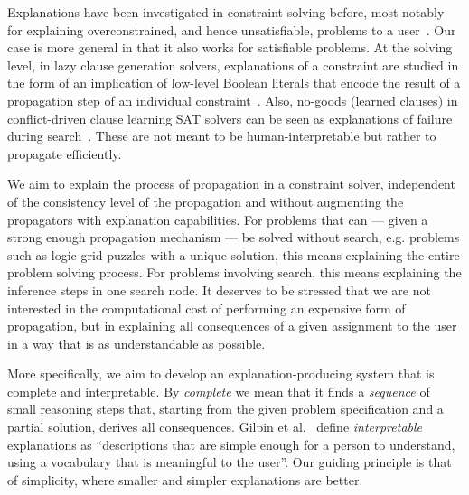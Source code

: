 Explanations have been investigated in constraint solving before, most notably for explaining overconstrained, and hence unsatisfiable, problems to a user~\cite{junker2001quickxplain}.
Our case is more general in that it also works for satisfiable problems.
At the solving level, in lazy clause generation solvers, explanations of a constraint are studied in the form of an implication of low-level Boolean literals that encode the result of a propagation step of an individual constraint~\cite{feydy2009lazy}. 
Also, no-goods (learned clauses) in conflict-driven clause learning SAT solvers can be seen as explanations of failure during search~\cite{marques2009conflict}. 
These are not meant to be human-interpretable but rather to propagate efficiently.

We aim to explain the process of propagation in a constraint solver, independent of the consistency level of the propagation and without augmenting the propagators with explanation capabilities.
For problems that can --- given a strong enough propagation mechanism --- be solved without search, e.g. problems such as logic grid puzzles with a unique solution, this means explaining the entire problem solving process. 
For problems involving search, this means explaining the inference steps  in one search node. 
It deserves to be stressed that we are not interested in the computational cost of performing an expensive form of propagation, but in explaining all consequences of a given assignment to the user in a way that is as understandable as possible. 

More specifically, we aim to develop an explanation-producing system that is complete and interpretable. 
By \textit{complete} we mean that it finds a \textit{sequence} of small reasoning steps that, starting from the given problem specification and a partial solution, derives all consequences. 
Gilpin et al.~\cite{DBLP:conf/dsaa/GilpinBYBSK18} define \textit{interpretable} explanations as ``descriptions that are simple enough for a person to understand, using a vocabulary that is meaningful to the user''. 
Our guiding principle is that of simplicity, where smaller and simpler explanations are better. 

